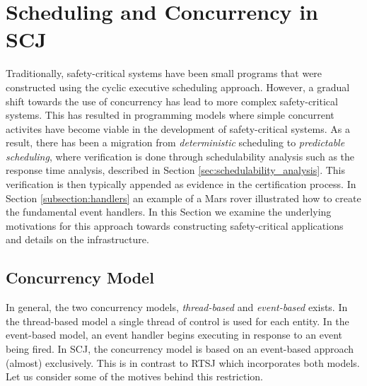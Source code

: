 \chapter{Scheduling and Concurrency in SCJ}
\label{chapter:scheduling}
Traditionally, safety-critical systems have been small programs that were constructed using the cyclic executive scheduling approach. However, a gradual shift towards the use of concurrency has lead to more complex safety-critical systems. This has resulted in programming models where simple concurrent activites have become viable in the development of safety-critical systems. As a result, there has been a migration from \textit{deterministic} scheduling to \textit{predictable scheduling}, where verification is done through schedulability analysis such as the response time analysis, described in Section \ref{sec:schedulability_analysis}. This verification is then typically appended as evidence in the certification process. In Section \ref{subsection:handlers} an example of a Mars rover illustrated how to create the fundamental event handlers. In this Section we examine the underlying motivations for this approach towards constructing safety-critical applications and details on the infrastructure.



\section{Concurrency Model} %
\label{sub:concurrency_model}
In general, the two concurrency models, \textit{thread-based} and \textit{event-based} exists. In the thread-based model a single thread of control is used for each entity. In the event-based model, an event handler begins executing in response to an event being fired. In SCJ, the concurrency model is based on an event-based approach (almost) exclusively. This is in contrast to RTSJ which incorporates both models. Let us consider some of the motives behind this restriction. 

